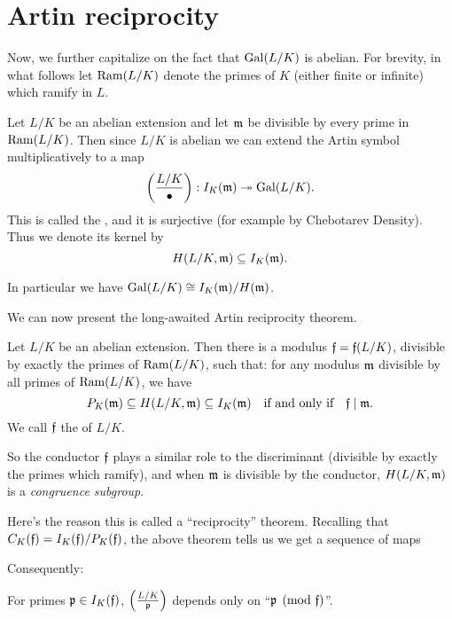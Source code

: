 \section{Artin reciprocity}
Now, we further capitalize on the fact that $\operatorname{Gal}(L/K)$ is abelian.
For brevity, in what follows let $\operatorname{Ram}(L/K)$ denote the primes of $K$
(either finite or infinite) which ramify in $L$.

\begin{definition}
	Let $L/K$ be an abelian extension and let $\mathfrak m$ be
	divisible by every prime in $\operatorname{Ram}(L/K)$.
	Then since $L/K$ is abelian we can extend the Artin symbol
	multiplicatively to a map
	\[
		\left( \frac{L/K}{\bullet} \right) :
		I_K(\mathfrak m) \twoheadrightarrow \operatorname{Gal}(L/K).
	\]
	This is called the ,
	and it is surjective (for example by Chebotarev Density).
	Thus we denote its kernel by 
	\[ H(L/K, \mathfrak m) \subseteq I_K(\mathfrak m). \]
\end{definition}
In particular we have
$\operatorname{Gal}(L/K) \cong I_K(\mathfrak m) / H(\mathfrak m)$.

We can now present the long-awaited Artin reciprocity theorem.
\begin{theorem}
	Let $L/K$ be an abelian extension.
	Then there is a modulus $\mathfrak f = \mathfrak f(L/K)$,
	divisible by exactly the primes of $\operatorname{Ram}(L/K)$, such that:
	for any modulus $\mathfrak m$ divisible by all primes of $\operatorname{Ram}(L/K)$, we have
	\[ 
		P_K(\mathfrak m) \subseteq H(L/K, \mathfrak m) \subseteq I_K(\mathfrak m)
		\quad\text{if and only if}\quad
		\mathfrak f \mid \mathfrak m.
	\]
	We call $\mathfrak f$ the  of $L/K$.
\end{theorem}
So the conductor $\mathfrak f$ plays a similar role to the discriminant
(divisible by exactly the primes which ramify),
and when $\mathfrak m$ is divisible by the conductor,
$H(L/K, \mathfrak m)$ is a \emph{congruence subgroup}.

Here's the reason this is called a ``reciprocity'' theorem.
Recalling that $C_K(\mathfrak f) = I_K(\mathfrak f) / P_K(\mathfrak f)$,
the above theorem tells us we get a sequence of maps
\begin{center}
\end{center}
Consequently:
\begin{moral}
	For primes $\mathfrak p \in I_K(\mathfrak f)$,
	$\left( \frac{L/K}{\mathfrak p} \right)$ depends
	only on ``$\mathfrak p \pmod {\mathfrak f}$''.
\end{moral}

